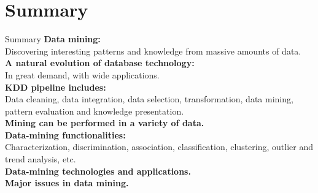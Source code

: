 \section{Summary}

\begin{frame}{Summary}
	\textbf{Data mining:}\\
	Discovering interesting patterns and knowledge from massive amounts of 
	data.\\[0.2cm]
	
	\textbf{A natural evolution of database technology:}\\
	In great demand, with wide applications.\\[0.2cm]
	
	\textbf{KDD pipeline includes:}\\
	Data cleaning, data integration, data selection, transformation, data 
	mining, pattern evaluation and knowledge presentation.\\[0.2cm]
	
	\textbf{Mining can be performed in a variety of data.}\\
	\textbf{Data-mining functionalities:}\\
	Characterization, discrimination, association, classification, clustering, 
	outlier and trend analysis, etc.\\[0.2cm]
	
	\textbf{Data-mining technologies and applications.}\\
	\textbf{Major issues in data mining.}\\
\end{frame}